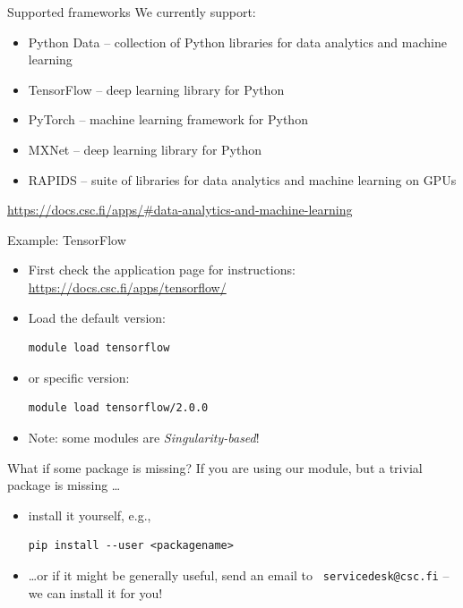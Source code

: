 \documentclass[aspectratio=1610,14pt]{beamer}
\newcommand{\link}[1]{\alert{\url{#1}}}
\newcommand{\vitem}{\vfill\item}
\begin{document}
\begin{frame}{Supported frameworks}
  We currently support:
  \begin{itemize}
  \item \alert{Python Data} -- collection of Python libraries for data
    analytics and machine learning
  \item \alert{TensorFlow} -- deep learning library for Python
  \item \alert{PyTorch} -- machine learning framework for Python
  \item \alert{MXNet} -- deep learning library for Python
  \item \alert{RAPIDS} -- suite of libraries for data analytics and
    machine learning on GPUs
  \end{itemize}

  {\small \link{https://docs.csc.fi/apps/\#data-analytics-and-machine-learning}}
\end{frame}

\begin{frame}[fragile]{Example: TensorFlow}
  \begin{itemize}
  \vitem First check the application page for instructions:
    \link{https://docs.csc.fi/apps/tensorflow/}
  \vitem Load the default version:
\begin{verbatim}
module load tensorflow
\end{verbatim}
  \vitem or specific version:
\begin{verbatim}
module load tensorflow/2.0.0
\end{verbatim}
  \vitem \alert{Note:} some modules are \emph{Singularity-based}!
\end{itemize}
\vfill
\end{frame}

\begin{frame}[fragile]{What if some package is missing?}
  If you are using our module, but a trivial package is missing \ldots
  \begin{itemize}
  \vitem install it yourself, e.g.,
\begin{verbatim}
pip install --user <packagename>
\end{verbatim}
  \vitem \ldots or if it might be generally useful, send an email to \alert{\tt
      servicedesk@csc.fi} -- we can install it for you!
  \end{itemize}
  \vfill
  
\end{frame}
\end{document}
